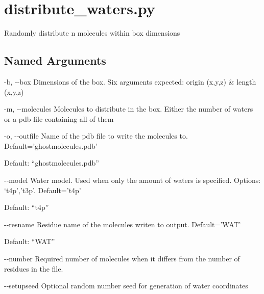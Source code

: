 \documentclass[letterpaper,10pt,english]{sphinxmanual}
\begin{document}
\section{distribute\_waters.py}
\label{\detokenize{tools:distribute-waters-py}}

Randomly distribute n molecules within box dimensions


%
\begin{sphinxVerbatim}[commandchars=\\\{\}]
  \PYG{p}{[}\PYG{p}{]} \PYG{p}{[}      \PYG{p}{]} \PYG{p}{[} \PYG{p}{]}
                            \PYG{p}{[} \PYG{p}{]} \PYG{p}{[} \PYG{p}{]} \PYG{p}{[} \PYG{p}{]}
                            \PYG{p}{[} \PYG{p}{]} \PYG{p}{[} \PYG{p}{]}
\end{sphinxVerbatim}


\subsection{Named Arguments}
\label{\detokenize{tools:Named Arguments}}\begin{optionlist}{3cm}
\item [-b, -{-}box]  
Dimensions of the box. Six arguments expected: origin (x,y,z) \& length (x,y,z)
\item [-m, -{-}molecules]  
Molecules to distribute in the box. Either the number of waters or a pdb file containing all of them
\item [-o, -{-}outfile]  
Name of the pdb file to write the molecules to. Default=’ghostmolecules.pdb’

Default: “ghostmolecules.pdb”
\item [-{-}model]  
Water model. Used when only the amount of waters is specified. Options: ‘t4p’,’t3p’. Default=’t4p’

Default: “t4p”
\item [-{-}resname]  
Residue name of the molecules writen to output. Default=’WAT’

Default: “WAT”
\item [-{-}number]  
Required number of molecules when it differs from the number of residues in the file.
\item [-{-}setupseed]  
Optional random number seed for generation of water coordinates
\end{optionlist}
\end{document}
